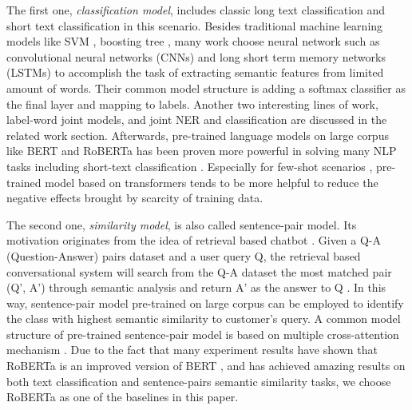The   first  one,  \emph{classification model},  includes  classic  long  text
classification  and  short  text  classification  in  this  scenario.  Besides
traditional  machine  learning  models  like  SVM \cite{suykens1999least},  
boosting  tree \cite{tu2005probabilistic},  many work
\cite{wen2016network}  choose  neural  network  such  as  convolutional neural
networks (CNNs) \cite{kim2014convolutional,zhang2015character,conneau2016very}
and       long       short       term       memory       networks      (LSTMs)
\cite{mousa2017contextual,liu2016recurrent}   to   accomplish   the   task  of
extracting  semantic  features from limited amount of words. Their common model
structure  is  adding  a  softmax classifier as the final layer and mapping to
labels.  Another  two  interesting lines of work, label-word joint models, and
joint  NER  and  classification  are  discussed  in  the related work section.
Afterwards,   pre-trained   language   models   on   large  corpus  like  BERT
\cite{devlin2018bert}  and  RoBERTa \cite{liu2019roberta} has been proven more
powerful  in  solving  many  NLP  tasks  including  short-text  classification
\cite{madabushi2020cost}.      Especially      for      few-shot     scenarios
\cite{yu2018diverse},     pre-trained     model    based    on    transformers
\cite{vaswani2017attention} tends to be more helpful to reduce the negative effects brought by scarcity of training data.

The  second  one,  \emph{similarity model},  is also called sentence-pair model.
Its  motivation  originates  from  the idea of retrieval based
chatbot   \cite{jafarpour2010filter,   leuski2011npceditor}.   Given  a  Q-A
(Question-Answer)  pairs dataset and a user query Q, the retrieval based conversational
system will search from the Q-A dataset  the most matched pair (Q', A') 
through  semantic  analysis  and  return  A'  as  the  answer  to Q
\cite{mnasri2019recent}. In this way, sentence-pair model pre-trained on large
corpus  can be employed  to  identify  the class with highest semantic similarity to
customer's    query.    A    common    model    structure    of    pre-trained 
sentence-pair model is based on multiple cross-attention
mechanism  \cite{barkan2020scalable}. Due to
the   fact   that   many   experiment   results   have   shown   that  RoBERTa
\cite{liu2019roberta} is an improved version of BERT \cite{devlin2018bert}, and has achieved amazing
results  on  both  text  classification and sentence-pairs semantic similarity
tasks, we choose RoBERTa as one of the baselines in this paper.

